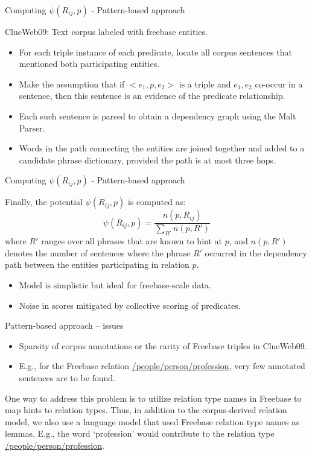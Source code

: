 \documentclass[pdf,11pt]{beamer}
\begin{document}
\begin{frame}{Computing $\psi(R_{ij},p)$ - Pattern-based approach}
\begin{block}{}
ClueWeb09: Text corpus labeled with freebase entities.
\end{block}

\begin{itemize}
\item For each triple instance of each predicate, locate all corpus sentences that mentioned both participating entities. 
\item Make the assumption that if $<e_1, p, e_2>$ is a triple and $e_1, e_2$ co-occur in a sentence, then this sentence is an evidence of the predicate relationship. 
\item Each such sentence is parsed to obtain a dependency graph using the Malt Parser.
\item Words in the path connecting the entities are joined together and added to a candidate phrase dictionary, provided the path is at most three hops.
\end{itemize}

\end{frame}

\begin{frame}{Computing $\psi(R_{ij},p)$ - Pattern-based approach}

Finally, the potential $\psi(R_{ij}, p)$ is computed as:
$$\psi(R_{ij},p) = \frac{n(p, R_{ij})}{\sum_{R'}{n(p, R')}}$$
where $R'$ ranges over all phrases that are known to
hint at $p$, and $n(p, R')$ denotes the number of sentences
where the phrase $R'$ occurred in the dependency
path between the entities participating in relation
$p$. 

\begin{itemize}
\item Model is simplistic but ideal for freebase-scale data.
\item Noise in scores mitigated by collective scoring of predicates.
\end{itemize}
\end{frame}


\begin{frame}{Pattern-based approach -- issues}

\begin{itemize}
\item Sparsity of corpus annotations or the rarity of Freebase triples in ClueWeb09. 
\item E.g., for the Freebase relation \url{/people/person/profession}, very few annotated sentences are to be found.

\end{itemize}
One way to address this problem is to utilize relation type names in Freebase to map hints to relation types. Thus, in addition to the corpus-derived relation
model, we also use a language model that used Freebase relation type names as lemmas. E.g., the word `profession' would contribute to the relation type \url{/people/person/profession}.

\end{frame}
\end{document}
